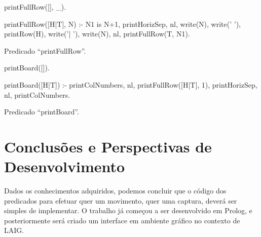 \documentclass[15pt,a4paper]{article}
\begin{document}
\begin{code}[H]
	\begin{verbatimtab}

printFullRow([], _).

printFullRow([H|T], N) :-
	N1 is N+1,
	printHorizSep,
	nl,
	write(N),
	write(' '),
	printRow(H),
	write('| '),
	write(N),
	nl,
	printFullRow(T, N1).
\end{verbatimtab}
\caption{Predicado ``printFullRow''.}
\end{code}



\begin{code}[H]
	\begin{verbatimtab}

printBoard([]).

printBoard([H|T]) :-
	printColNumbers,
	nl,
	printFullRow([H|T], 1),
	printHorizSep,
	nl,
	printColNumbers.
\end{verbatimtab}
\caption{Predicado ``printBoard''.}
\end{code}


\newpage

\section{Conclusões e Perspectivas de Desenvolvimento}


Dados os conhecimentos adquiridos, podemos concluir que o código dos predicados para efetuar quer um movimento, quer uma captura, deverá ser simples de implementar. 
O trabalho já começou a ser desenvolvido em Prolog, e posteriormente será criado um interface em ambiente gráfico no contexto de LAIG.
\end{document}
